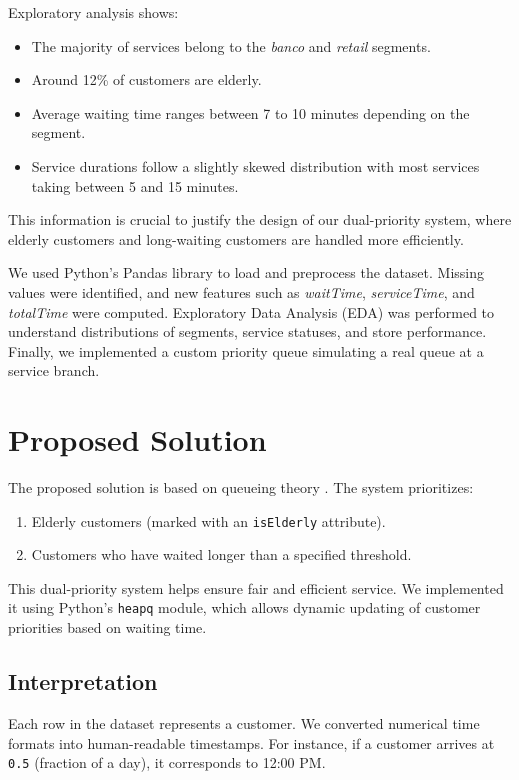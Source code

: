 \documentclass[twoside]{article}
\begin{document}
Exploratory analysis shows:
\begin{itemize}
    \item The majority of services belong to the \textit{banco} and \textit{retail} segments.
    \item Around 12\% of customers are elderly.
    \item Average waiting time ranges between 7 to 10 minutes depending on the segment.
    \item Service durations follow a slightly skewed distribution with most services taking between 5 and 15 minutes.
\end{itemize}

This information is crucial to justify the design of our dual-priority system, where elderly customers and long-waiting customers are handled more efficiently.


We used Python's Pandas library to load and preprocess the dataset. Missing values were identified, and new features such as \textit{waitTime}, \textit{serviceTime}, and \textit{totalTime} were computed. Exploratory Data Analysis (EDA) was performed to understand distributions of segments, service statuses, and store performance. Finally, we implemented a custom priority queue simulating a real queue at a service branch.

\section{Proposed Solution}
The proposed solution is based on queueing theory \cite{queueingTheory}. The system prioritizes:
\begin{enumerate}
    \item Elderly customers (marked with an \texttt{isElderly} attribute).
    \item Customers who have waited longer than a specified threshold.
\end{enumerate}
This dual-priority system helps ensure fair and efficient service. We implemented it using Python's \texttt{heapq} module, which allows dynamic updating of customer priorities based on waiting time.

\subsection*{Interpretation}
Each row in the dataset represents a customer. We converted numerical time formats into human-readable timestamps. For instance, if a customer arrives at \texttt{0.5} (fraction of a day), it corresponds to 12:00 PM.
\end{document}
